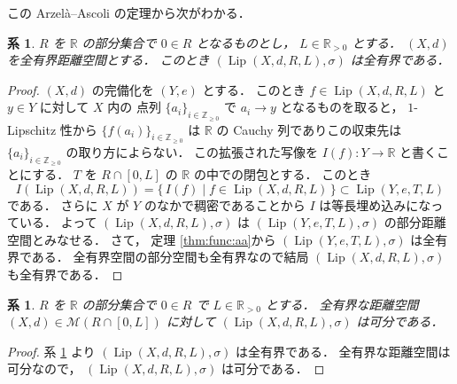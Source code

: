 \documentclass[leqno, 12pt]{jsarticle}
\newtheorem{cor}[thm]{系}
\newcommand{\zz}{\mathbb{Z}}
\newcommand{\yozz}[1]{\zz_{\ge #1}}
\newcommand{\rr}{\mathbb{R}}
\DeclareMathOperator{\lip}{Lip}
\newcommand{\Met}[1]{\mathscr{M}(#1)}
\newcommand{\LipSpace}[4]{\lip(#1,#2,#3,#4)}
\newcommand{\LipDist}{\sigma}
\newcommand{\pospart}[1]{#1_{>0}}
\newcommand{\rrpos}{\pospart{\rr}}
\begin{document}
この
Arzel\`{a}--Ascoli
の定理から次がわかる．
\begin{cor}\label{cor:func:totbd}
$R$
を
$\rr$
の部分集合で
$0\in R$
となるものとし，
$L\in \rrpos$
とする．
$(X, d)$
を全有界距離空間とする．
このとき
$(\LipSpace{X}{d}{R}{L}, \LipDist)$
は全有界である．
\end{cor}
\begin{proof}
$(X, d)$
の完備化を
$(Y, e)$
とする．
このとき
$f\in \LipSpace{X}{d}{R}{L}$
と
$y\in Y$
に対して
$X$
内の
点列
$\{a_{i}\}_{i\in \yozz{0}}$
で
$a_{i}\to y$
となるものを取ると，
$1$-Lipschitz
性から
$\{f(a_{i})\}_{i\in \yozz{0}}$
は
$\rr$
の
Cauchy
列でありこの収束先は
$\{a_{i}\}_{i\in\yozz{0}}$
の取り方によらない．
この拡張された写像を
$I(f)\colon  Y\to \rr$
と書くことにする．
$T$
を
$R\cap [0, L]$
の
$\rr$
の中での閉包とする．
このとき
\[
I(\LipSpace{X}{d}{R}{L})
=\{\, I(f)\mid f\in \LipSpace{X}{d}{R}{L}\,\}
\subset \LipSpace{Y}{e}{T}{L}
\]
である．
さらに
$X$
が
$Y$
のなかで稠密であることから
$I$
は等長埋め込みになっている．
よって
$(\LipSpace{X}{d}{R}{L}, \LipDist)$
は
$(\LipSpace{Y}{e}{T}{L}, \LipDist)$
の部分距離空間とみなせる．
さて，
定理
\ref{thm:func:aa}から
$(\LipSpace{Y}{e}{T}{L}, \LipDist)$
は全有界である．
全有界空間の部分空間も全有界なので結局
$(\LipSpace{X}{d}{R}{L}, \LipDist)$
も全有界である．
\end{proof}




\begin{cor}\label{cor:func:sep}
$R$
を
$\rr$
の部分集合で
$0\in R$
で
$L\in \rrpos$
とする．
全有界な距離空間
$(X, d)\in \Met{R\cap[0, L]}$
に対して
$(\LipSpace{X}{d}{R}{L}, \LipDist)$
は可分である．
\end{cor}
\begin{proof}
系
\ref{cor:func:totbd}
より
$(\LipSpace{X}{d}{R}{L}, \LipDist)$
は全有界である．
全有界な距離空間は可分なので，
$(\LipSpace{X}{d}{R}{L}, \LipDist)$
は可分である．
\end{proof}
\end{document}
